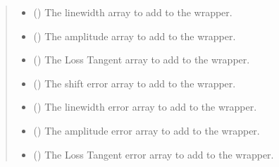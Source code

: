 \documentclass[letterpaper,10pt,english]{sphinxmanual}
\begin{document}
\begin{fulllineitems}
\begin{fulllineitems}
\begin{quote}
\begin{description}
\begin{itemize}
\item {} 
\sphinxAtStartPar
{} (\sphinxstyleliteralemphasis{\sphinxupquote{, }}) \textendash{} The linewidth array to add to the wrapper.

\item {} 
\sphinxAtStartPar
{} (\sphinxstyleliteralemphasis{\sphinxupquote{, }}) \textendash{} The amplitude array to add to the wrapper.

\item {} 
\sphinxAtStartPar
{} (\sphinxstyleliteralemphasis{\sphinxupquote{, }}) \textendash{} The Loss Tangent array to add to the wrapper.

\item {} 
\sphinxAtStartPar
{} (\sphinxstyleliteralemphasis{\sphinxupquote{, }}) \textendash{} The shift error array to add to the wrapper.

\item {} 
\sphinxAtStartPar
{} (\sphinxstyleliteralemphasis{\sphinxupquote{, }}) \textendash{} The linewidth error array to add to the wrapper.

\item {} 
\sphinxAtStartPar
{} (\sphinxstyleliteralemphasis{\sphinxupquote{, }}) \textendash{} The amplitude error array to add to the wrapper.

\item {} 
\sphinxAtStartPar
{} (\sphinxstyleliteralemphasis{\sphinxupquote{, }}) \textendash{} The Loss Tangent error array to add to the wrapper.


\end{itemize}
\end{description}
\end{quote}
\end{fulllineitems}
\end{fulllineitems}
\end{document}
